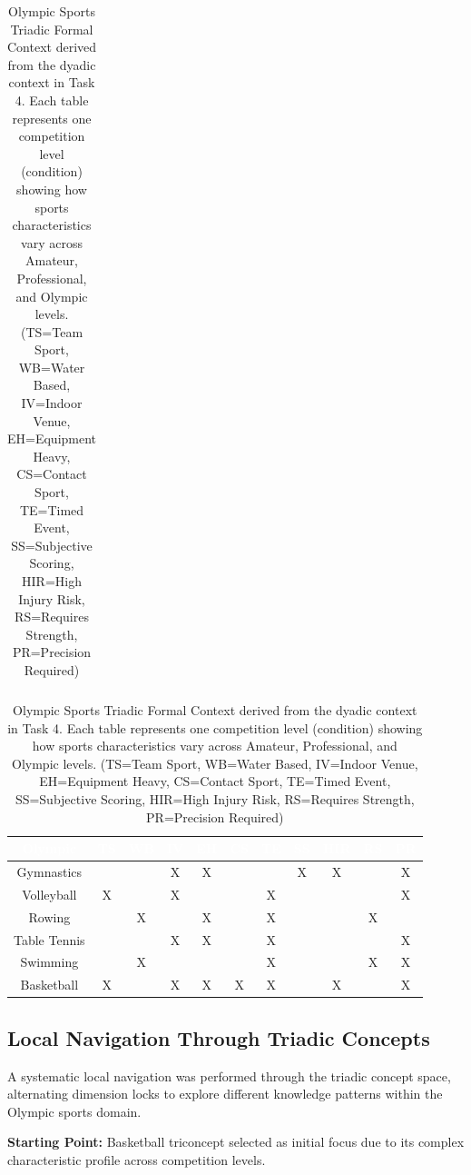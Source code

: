\documentclass{article}
\begin{document}
\begin{table}[h]
\begin{tabular}{|c|c|c|c|c|c|c|c|c|c|c|}
\hline
\end{tabular}
\vspace{0.5cm}
\begin{tabular}{|c|c|c|c|c|c|c|c|c|c|c|}
\hline
\rowcolor{blue!70} \textcolor{white}{\textbf{Olympic}} & \textcolor{white}{\textbf{TS}} & \textcolor{white}{\textbf{WB}} & \textcolor{white}{\textbf{IV}} & \textcolor{white}{\textbf{EH}} & \textcolor{white}{\textbf{CS}} & \textcolor{white}{\textbf{TE}} & \textcolor{white}{\textbf{SS}} & \textcolor{white}{\textbf{HIR}} & \textcolor{white}{\textbf{RS}} & \textcolor{white}{\textbf{PR}} \\
\hline
\rowcolor{blue!30} Gymnastics & & & X & X & & & X & X & & X \\
\hline
\rowcolor{blue!30} Volleyball & X & & X & & & X & & & & X \\
\hline
\rowcolor{blue!30} Rowing & & X & & X & & X & & & X & \\
\hline
\rowcolor{blue!30} Table Tennis & & & X & X & & X & & & & X \\
\hline
\rowcolor{blue!30} Swimming & & X & & & & X & & & X & X \\
\hline
\rowcolor{blue!30} Basketball & X & & X & X & X & X & & X & & X \\
\hline
\end{tabular}
\caption{Olympic Sports Triadic Formal Context derived from the dyadic context in Task 4. Each table represents one competition level (condition) showing how sports characteristics vary across Amateur, Professional, and Olympic levels. (TS=Team Sport, WB=Water Based, IV=Indoor Venue, EH=Equipment Heavy, CS=Contact Sport, TE=Timed Event, SS=Subjective Scoring, HIR=High Injury Risk, RS=Requires Strength, PR=Precision Required)}
\end{table}

\subsection*{Local Navigation Through Triadic Concepts}

A systematic local navigation was performed through the triadic concept space, alternating dimension locks to explore different knowledge patterns within the Olympic sports domain.

\textbf{Starting Point:} Basketball triconcept selected as initial focus due to its complex characteristic profile across competition levels.
\end{document}
